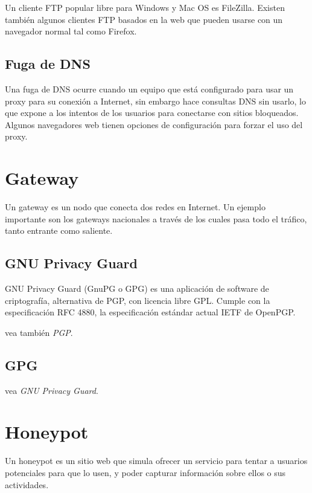 Un cliente FTP popular libre para Windows y Mac OS es FileZilla. Existen
también algunos clientes FTP basados en la web que pueden usarse con un
navegador normal tal como Firefox.

\subsection{Fuga de DNS}\label{fuga-de-dns}

Una fuga de DNS ocurre cuando un equipo que está configurado para usar
un proxy para su conexión a Internet, sin embargo hace consultas DNS sin
usarlo, lo que expone a los intentos de los usuarios para conectarse con
sitios bloqueados. Algunos navegadores web tienen opciones de
configuración para forzar el uso del proxy.

\section{Gateway}\label{gateway}

Un gateway es un nodo que conecta dos redes en Internet. Un ejemplo
importante son los gateways nacionales a través de los cuales pasa todo
el tráfico, tanto entrante como saliente.

\subsection{GNU Privacy Guard}\label{gnu-privacy-guard}

GNU Privacy Guard (GnuPG o GPG) es una aplicación de software de
criptografía, alternativa de PGP, con licencia libre GPL. Cumple con la
especificación RFC 4880, la especificación estándar actual IETF de
OpenPGP.

vea también \emph{PGP}.

\subsection{GPG}\label{gpg}

vea \emph{GNU Privacy Guard}.

\section{Honeypot}\label{honeypot}

Un honeypot es un sitio web que simula ofrecer un servicio para tentar a
usuarios potenciales para que lo usen, y poder capturar información
sobre ellos o sus actividades.

